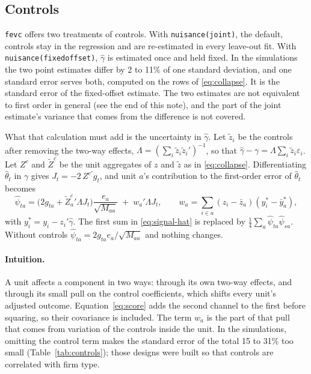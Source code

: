 \documentclass[11pt]{article}
\newcommand{\fevc}{\texttt{fevc}}
\begin{document}
\subsection{Controls}\label{sec:controls}

\fevc{} offers two treatments of controls. With \texttt{nuisance(joint)},
the default, controls stay in the regression and are re-estimated in every
leave-out fit. With \texttt{nuisance(fixedoffset)}, $\hat\gamma$ is estimated
once and held fixed. In the simulations the two point estimates differ by 2
to 11\% of one standard deviation, and one standard error serves both,
computed on the rows of \eqref{eq:collapse}. It is the standard error of the
fixed-offset estimate. The two estimates are not equivalent to first order
in general (see the end of this note), and the part of the joint estimate's
variance that comes from the difference is not covered.

What that calculation must add is the uncertainty in $\hat\gamma$. Let
$\tilde z_i$ be the controls after removing the two-way effects,
$\Lambda=(\sum_i\tilde z_i\tilde z_i')^{-1}$, so that
$\hat\gamma-\gamma=\Lambda\sum_i\tilde z_i\varepsilon_i$. Let $Z^c$ and
$\tilde Z^c$ be the unit aggregates of $z$ and $\tilde z$ as in
\eqref{eq:collapse}. Differentiating $\hat\theta_t$ in $\gamma$ gives
$J_t=-2\,Z^{c\prime}g_t$, and unit $a$'s contribution to the first-order error
of $\hat\theta_t$ becomes
\begin{equation}\label{eq:score}
 \hat\psi_{ta}=\bigl(2g_{ta}+\tilde Z^c_a{}'\Lambda J_t\bigr)
 \frac{e_a}{\sqrt{M_{aa}}}
 \;+\;w_a'\Lambda J_t,\qquad
 w_a=\sum_{i\in a}(z_i-\bar z_a)(y^\ast_i-\bar y^\ast_a),
\end{equation}
with $y^\ast_i=y_i-z_i'\hat\gamma$. The first sum in \eqref{eq:signal-hat} is
replaced by $\tfrac14\sum_a\hat\psi_{ta}\hat\psi_{sa}$. Without controls
$\hat\psi_{ta}=2g_{ta}e_a/\sqrt{M_{aa}}$ and nothing changes.

\paragraph{Intuition.} A unit affects a component in two ways: through its
own two-way effects, and through its small pull on the control coefficients,
which shifts every unit's adjusted outcome. Equation~\eqref{eq:score} adds
the second channel to the first before squaring, so their covariance is
included. The term $w_a$ is the part of that pull that comes from variation
of the controls inside the unit. In the simulations, omitting the control
term makes the standard error of the total 15 to 31\% too small
(Table~\ref{tab:controls}); those designs were built so that controls are
correlated with firm type.
\end{document}

